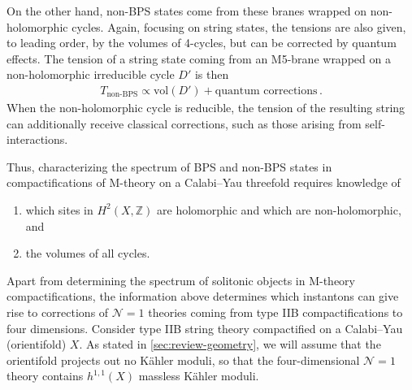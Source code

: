 \documentclass[11pt,dvipsnames]{article}
\theoremstyle{definition}
\begin{document}
On the other hand, non-BPS states come from these branes wrapped on non-holomorphic cycles. Again, focusing on string states, the tensions are also given, to leading order, by the volumes of 4-cycles, but can be corrected by quantum effects. The tension of a string state coming from an M5-brane wrapped on a non-holomorphic irreducible cycle $D'$ is then
\begin{align}
    T_{\text{non-BPS}} \propto \text{vol}(D') + \text{quantum corrections}\,.
\end{align}
When the non-holomorphic cycle is reducible, the tension of the resulting string can additionally receive classical corrections, such as those arising from self-interactions.

Thus, characterizing the spectrum of BPS and non-BPS states in compactifications of M-theory on a Calabi--Yau threefold requires knowledge of
\begin{enumerate}
    \item which sites in $H^2(X, \mathbb{Z})$ are holomorphic and which are non-holomorphic, and
    \item the volumes of all cycles.
\end{enumerate}

Apart from determining the spectrum of solitonic objects in M-theory compactifications, the information above determines which instantons can give rise to corrections of $\mathcal{N}=1$ theories coming from type IIB compactifications to four dimensions. Consider type IIB string theory compactified on a Calabi--Yau (orientifold) $X$. As stated in \cref{sec:review-geometry}, we will assume that the orientifold projects out no K\"ahler moduli, so that the four-dimensional $\mathcal{N}=1$ theory contains $h^{1,1}(X)$ massless K\"ahler moduli. 
\end{document}
